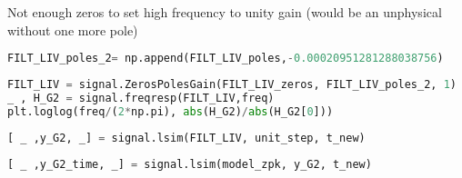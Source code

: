 
Not enough zeros to set high frequency to unity gain (would be an unphysical without one more pole)

\begin{spacing}{1.2} \begin{lstlisting}[frame=single,language=Python]
FILT_LIV_poles_2= np.append(FILT_LIV_poles,-0.00020951281288038756)
\end{lstlisting} \end{spacing}

\begin{spacing}{1.2} \begin{lstlisting}[frame=single,language=Python]
FILT_LIV = signal.ZerosPolesGain(FILT_LIV_zeros, FILT_LIV_poles_2, 1)
_ , H_G2 = signal.freqresp(FILT_LIV,freq)
plt.loglog(freq/(2*np.pi), abs(H_G2)/abs(H_G2[0]))
\end{lstlisting} \end{spacing}


\begin{spacing}{1.2} \begin{lstlisting}[frame=single,language=Python]
[ _ ,y_G2, _] = signal.lsim(FILT_LIV, unit_step, t_new)
\end{lstlisting} \end{spacing}

\begin{spacing}{1.2} \begin{lstlisting}[frame=single,language=Python]
[ _ ,y_G2_time, _] = signal.lsim(model_zpk, y_G2, t_new)
\end{lstlisting} \end{spacing}

